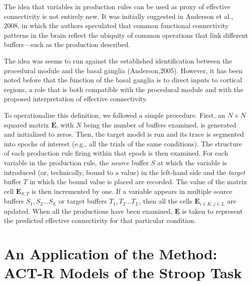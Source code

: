 \documentclass[10pt,letterpaper]{article}
\newcommand{\mat}[1]{\boldsymbol{#1}} %
\begin{document}
The idea that variables in production rules can be used as proxy of effective connectivity is not entirely new. It was initially suggested in Anderson et al., 2008, in which the authors speculated that common functional connectivity patterns in the brain reflect the ubiquity of common operations that link different buffers---such as the production described.

The idea was seems to run against the established identification between the procedural module and the basal ganglia (Anderson,2005). However, it has been noted before that the function of the basal ganglia is to direct inputs to cortical regions, a role that is both compatible with the procedural module and with the proposed interpretation of effective connectivity.

To operationalize this definition, we followed a simple procedure. First, an $N \times N$ squared matrix ${\mat{E}}$, with $N$ being the number of buffers examined, is generated and initialized to zeros. Then, the target model is run and its trace is segmented into epochs of interest  (e.g., all the trials of the same conditions). The structure of each production rule firing within that epoch is then examined. For each variable in the production rule, the {\it source} buffer $S$ at which the variable is introduced (or, technically, bound to a value) in the left-hand side and the {\it target} buffer $T$ in which the bound value is placed are recorded. The value of the matrix cell $\mat{E}_{S,T}$ is then incremented by one. If a variable appears in multiple source buffers $S_1, S_2 \dots S_L$ or target buffers $T_1, T_2 \dots T_L$, then all the cells $\mat{E}_{i \in K, j \in  L}$ are updated. When all the productions have been examined, $\mat{E}$ is taken to represent the predicted effective connectivity for that particular condition. 


\section{An Application of the Method: \\ ACT-R Models of the Stroop Task}
\end{document}
